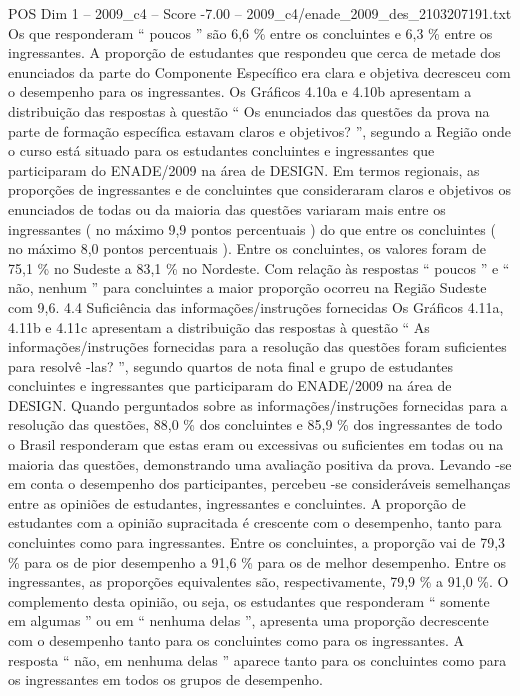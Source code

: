 \begin{textsample}{POS Dim 1 – 2009\_c4 – Score -7.00 – 2009\_c4/enade\_2009\_des\_2103207191.txt}
Os que responderam “ poucos ” são 6,6 \% entre os concluintes e 6,3 \% entre os ingressantes.
A proporção de estudantes que respondeu que cerca de metade dos enunciados da parte do Componente Específico era clara e objetiva decresceu com o desempenho para os ingressantes.
Os Gráficos 4.10a e 4.10b apresentam a distribuição das respostas à questão “ Os enunciados das questões da prova na parte de formação específica estavam claros e objetivos? ”, segundo a Região onde o curso está situado para os estudantes concluintes e ingressantes que participaram do ENADE/2009 na área de DESIGN.
Em termos regionais, as proporções de ingressantes e de concluintes que consideraram claros e objetivos os enunciados de todas ou da maioria das questões variaram mais entre os ingressantes ( no máximo 9,9 pontos percentuais ) do que entre os concluintes ( no máximo 8,0 pontos percentuais ).
Entre os concluintes, os valores foram de 75,1 \% no Sudeste a 83,1 \% no Nordeste.
Com relação às respostas “ poucos ” e “ não, nenhum ” para concluintes a maior proporção ocorreu na Região Sudeste com 9,6. 4.4 Suficiência das informações/instruções fornecidas Os Gráficos 4.11a, 4.11b e 4.11c apresentam a distribuição das respostas à questão “ As informações/instruções fornecidas para a resolução das questões foram suficientes para resolvê -las? ”, segundo quartos de nota final e grupo de estudantes concluintes e ingressantes que participaram do ENADE/2009 na área de DESIGN.
Quando perguntados sobre as informações/instruções fornecidas para a resolução das questões, 88,0 \% dos concluintes e 85,9 \% dos ingressantes de todo o Brasil responderam que estas eram ou excessivas ou suficientes em todas ou na maioria das questões, demonstrando uma avaliação positiva da prova.
Levando -se em conta o desempenho dos participantes, percebeu -se consideráveis semelhanças entre as opiniões de estudantes, ingressantes e concluintes.
A proporção de estudantes com a opinião supracitada é crescente com o desempenho, tanto para concluintes como para ingressantes.
Entre os concluintes, a proporção vai de 79,3 \% para os de pior desempenho a 91,6 \% para os de melhor desempenho.
Entre os ingressantes, as proporções equivalentes são, respectivamente, 79,9 \% a 91,0 \%.
O complemento desta opinião, ou seja, os estudantes que responderam “ somente em algumas ” ou em “ nenhuma delas ”, apresenta uma proporção decrescente com o desempenho tanto para os concluintes como para os ingressantes.
A resposta “ não, em nenhuma delas ” aparece tanto para os concluintes como para os ingressantes em todos os grupos de desempenho.

\end{textsample}
